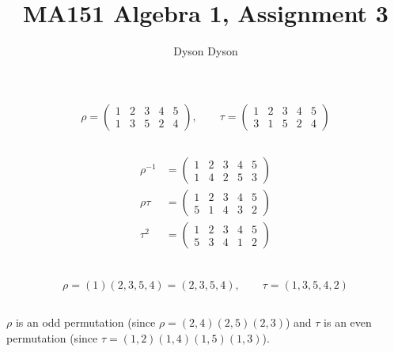 \documentclass[a4paper]{article}
\title{MA151 Algebra 1, Assignment 3}
\author{Dyson Dyson}
\date{}
\begin{document}
\maketitle

\setlength{\parindent}{0em}
\setlength{\parskip}{1em}

\renewcommand{\thesubsection}{Q\arabic{section}~\roman{subsection}.}

$$\rho = \begin{pmatrix}1 & 2 & 3 & 4 & 5\\ 1 & 3 & 5 & 2 & 4\end{pmatrix}, \qquad \tau = \begin{pmatrix}1 & 2 & 3 & 4 & 5\\ 3 & 1 & 5 & 2 & 4\end{pmatrix}$$

\subsection{}

\begin{align*}
	\rho^{-1} &= \begin{pmatrix}1 & 2 & 3 & 4 & 5\\ 1 & 4 & 2 & 5 & 3\end{pmatrix}\\[1ex]
	\rho\tau  &= \begin{pmatrix}1 & 2 & 3 & 4 & 5\\ 5 & 1 & 4 & 3 & 2\end{pmatrix}\\[1ex]
	\tau^2    &= \begin{pmatrix}1 & 2 & 3 & 4 & 5\\ 5 & 3 & 4 & 1 & 2\end{pmatrix}\\[1ex]
\end{align*}

\subsection{}

$$\rho = (1) (2, 3, 5, 4) = (2, 3, 5, 4), \qquad \tau = (1, 3, 5, 4, 2)$$

\subsection{}

$\rho$ is an odd permutation (since $\rho = (2, 4) (2, 5) (2, 3)$) and $\tau$ is an even permutation (since $\tau = (1, 2) (1, 4) (1, 5) (1, 3)$).
\end{document}
